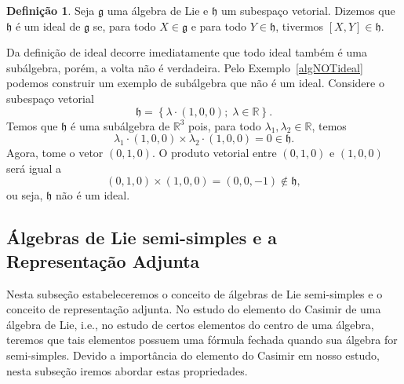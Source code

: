 \documentclass[twoside,openright,titlepage,numbers=noenddot,headinclude,  lineheaders footinclude=true,cleardoublepage=empty,
                                BCOR=5mm,paper=a4,fontsize=12pt ]{scrbook}
\theoremstyle{definition}
\newtheorem{definicao}{Definição}[chapter]
\begin{document}
\begin{definicao}
Seja $\mathfrak{g}$ uma álgebra de Lie e $\mathfrak{h}$ um subespaço vetorial. 
Dizemos que $\mathfrak{h}$ é um ideal de $\mathfrak{g}$ se, para todo $X \in \mathfrak{g}$ e 
para todo $Y \in \mathfrak{h}$, tivermos $[X, Y] \in \mathfrak{h}$.
\end{definicao} 
Da definição de ideal decorre imediatamente que todo ideal também é uma subálgebra, porém, a volta não é verdadeira. 
Pelo Exemplo~\ref{algNOTideal}  podemos construir um exemplo de subálgebra que não é um ideal. Considere o subespaço vetorial
\[ \mathfrak{h} = \left\{ \lambda \cdot (1,0,0); \; \lambda \in \mathbb{R} \right\} .\]
Temos que $\mathfrak{h}$ é uma subálgebra de $\mathbb{R}^3$ pois, para todo $\lambda_1, \lambda_2 \in \mathbb{R}$, temos
\[ \lambda_1 \cdot (1,0,0) \times \lambda_2 \cdot (1,0,0) = 0 \in \mathfrak{h}.\]
Agora, tome o vetor $(0,1,0)$. O produto vetorial entre $(0,1,0)$ e $(1,0,0)$ será igual a
\[ (0,1,0) \times (1,0,0) = (0,0,-1) \notin \mathfrak{h}, \]
ou seja, $\mathfrak{h}$ não é um ideal.
%

\subsection{\'Algebras de Lie semi-simples e a Representa\c{c}\~ao Adjunta}
Nesta subseção estabeleceremos o conceito de álgebras de Lie semi-simples e o conceito
de representação adjunta. No estudo do elemento do Casimir de uma álgebra de Lie, i.e.,
no estudo de certos elementos do centro de uma álgebra, teremos que tais elementos
possuem uma fórmula fechada quando sua álgebra for semi-simples. Devido a importância do
elemento do Casimir em nosso estudo, nesta subseção iremos abordar estas propriedades.
\end{document}
